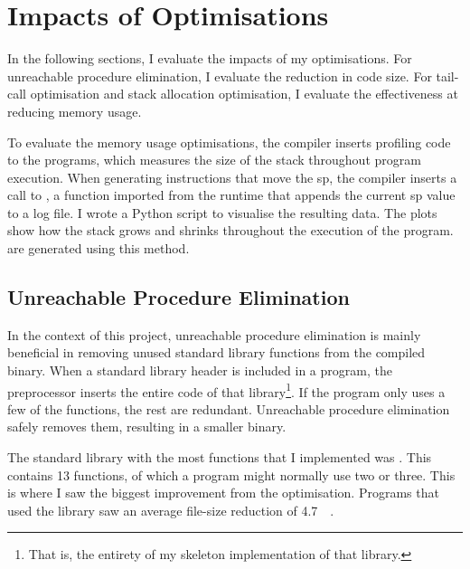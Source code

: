 \documentclass[00-main.tex]{subfiles}
\begin{document}
\section{Impacts of Optimisations}\label{sec:eval:optimisations}

In the following sections, I evaluate the impacts of my optimisations.
For unreachable procedure elimination, I evaluate the reduction in code size.
For tail-call optimisation and stack allocation optimisation, I evaluate the effectiveness at reducing memory usage.

To evaluate the memory usage optimisations, the compiler inserts profiling code to the programs, which measures the size of the stack throughout program execution.
When generating instructions that move the \acrlong{sp}, the compiler inserts a call to , a function imported from the runtime that appends the current \acrlong{sp} value to a log file.
I wrote a Python script to visualise the resulting data.
The plots show how the stack grows and shrinks throughout the execution of the program.
 are generated using this method.

\subsection{Unreachable Procedure Elimination}\label{sec:eval:unreachable procedure elimination}

In the context of this project, unreachable procedure elimination is mainly beneficial in removing unused standard library functions from the compiled binary.
When a standard library header is included in a program, the preprocessor inserts the entire code of that library\footnote{That is, the entirety of my skeleton implementation of that library.}.
If the program only uses a few of the functions, the rest are redundant.
Unreachable procedure elimination safely removes them, resulting in a smaller binary.


The standard library with the most functions that I implemented was .
This contains 13 functions, of which a program might normally use two or three.
This is where I saw the biggest improvement from the optimisation.
Programs that used the  library saw an average file-size reduction of \SI{4.7}{\kilo\byte}.
\end{document}
